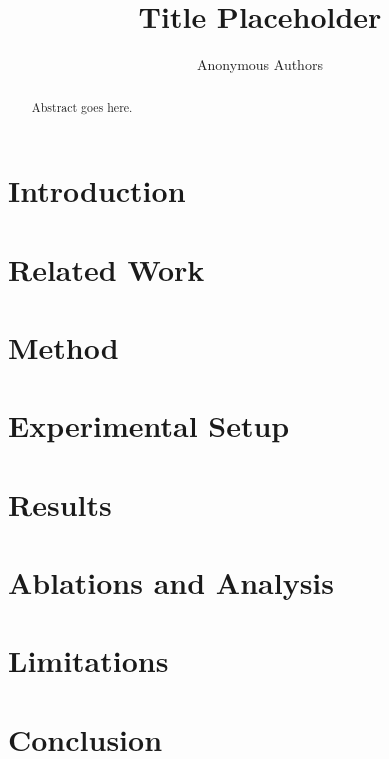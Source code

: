 \documentclass{article}
\title{Title Placeholder}
\author{Anonymous Authors}
\date{}
\begin{document}
\maketitle

\begin{abstract}
Abstract goes here.
\end{abstract}

\section{Introduction}

\section{Related Work}

\section{Method}

\section{Experimental Setup}

\section{Results}

\section{Ablations and Analysis}

\section{Limitations}

\section{Conclusion}



\end{document}
